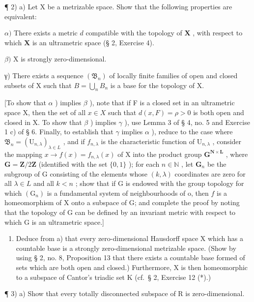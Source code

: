 ¶ 2) a) Let X be a metrizable space. Show that the following properties are equivalent:

\(\alpha)\) There exists a metric \(d\) compatible with the topology of \(\mathbf{X}\) , with respect to which \(\mathbf{X}\) is an ultrametric space (§ 2, Exercise 4).

\(\beta)\) X is strongly zero-dimensional.

γ) There exists a sequence \((\mathfrak{B}_{n})\) of locally finite families of open and closed subsets of X such that \(B = \bigcup_{n} B_{n}\) is a base for the topology of X.

{[}To show that \(\alpha\) ) implies \(\beta\) ), note that if F is a closed set in an ultrametric space X, then the set of all \(x \in X\) such that \(d(x, F) = \rho > 0\) is both open and closed in X. To show that \(\beta\) ) implies \(\gamma\) ), use Lemma 3 of § 4, no. 5 and Exercise 1 c) of § 6. Finally, to establish that \(\gamma\) implies \(\alpha\) ), reduce to the case where \(\mathfrak{B}_n = (\mathrm{U}_{n,\lambda})_{\lambda \in L}\) , and if \(f_{n,\lambda}\) is the characteristic function of \(\mathrm{U}_{n,\lambda}\) , consider the mapping \(x \to f(x) = f_{n,\lambda}(x)\) of X into the product group \(\mathbf{G}^{\mathbf{N} \times \mathbf{L}}\) , where \(\mathbf{G} = \mathbf{Z}/2\mathbf{Z}\) (identified with the set \(\{0, 1\}\) ); for each \(n \in \mathbb{N}\) , let \(\mathbf{G}_n\) be the subgroup of G consisting of the elements whose \((k, \lambda)\) coordinates are zero for all \(\lambda \in L\) and all \(k < n\) ; show that if G is endowed with the group topology for which \((\mathrm{G}_n)\) is a fundamental system of neighbourhoods of o, then \(f\) is a homeomorphism of X onto a subspace of G; and complete the proof by noting that the topology of G can be defined by an invariant metric with respect to which G is an ultrametric space.{]}

\begin{enumerate}
\def\labelenumi{\alph{enumi})}
\setcounter{enumi}{1}
\tightlist
\item
  Deduce from a) that every zero-dimensional Hausdorff space X which has a countable base is a strongly zero-dimensional metrizable space. (Show by using § 2, no. 8, Proposition 13 that there exists a countable base formed of sets which are both open and closed.) Furthermore, X is then homeomorphic to a subspace of Cantor's triadic set K (cf.~§ 2, Exercise 12 (*).)
\end{enumerate}

¶ 3) a) Show that every totally disconnected subspace of R is zero-dimensional.

